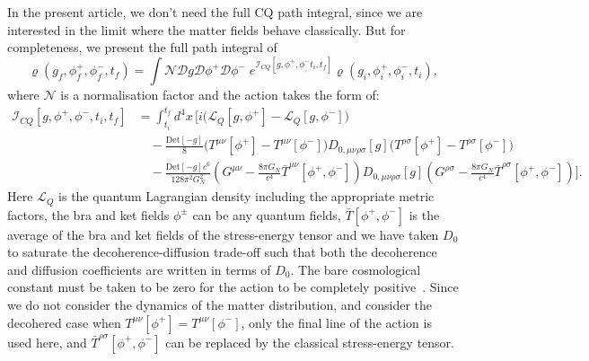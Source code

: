 \documentclass[aps,pra,amsmath,amssymb,amsthm,floatfix,nofootinbib,notitlepage,superscriptaddress,10pt]{revtex4-2}
\begin{document}
In the present article, we don't need the full CQ path integral, since we are interested in the limit where the matter fields behave classically. But for completeness, 
we present the full path integral of \cite{oppenheim2023covariant}
\begin{equation}
	\label{eq: GRPathMain}
	\varrho(g_f,\phi^+_f,\phi^-_f,t_f)= \int \mathcal{N} \mathcal{D} g\mathcal{D}\phi^+\mathcal{D}\phi^-  \; e^{\mathcal{I}_{CQ}[g,\phi^+,\phi^-_,t_i,t_f]}  \varrho(g_i,\phi^+_i,\phi^-_i,t_i) ,
\end{equation}
where $\mathcal{N}$ is a normalisation factor and the action takes the form of:
\begin{equation}
	\label{eq: CQaction}
	\begin{split}
		\mathcal{I}_{CQ}[g,\phi^+,\phi^-,t_i,t_f] &=\int_{t_i}^{t_f} d^4x\, \bigg[ i\big(\mathcal{L}_{Q}[g,\phi^+]-\mathcal{L}_{Q}[g,\phi^-]\big)\\&\quad -\frac{\text{Det}[-g]}{8}\big(T^{\mu\nu}[\phi^+] - T^{\mu \nu}[\phi^-]\big) D_{0,\mu \nu\rho \sigma}[g]\big(T^{\rho\sigma}[\phi^+] - T^{\rho \sigma}[\phi^-]\big) \\
		& \quad - \frac{\text{Det}[-g] c^6}{128\pi^2 G_N^2 } \left( G^{\mu \nu} - \frac{8 \pi G_N}{c^4}\bar{T}^{\mu\nu}[\phi^+,\phi^-]  \right) D_{0, \mu \nu \rho \sigma}[g] \left( G^{\rho \sigma} - \frac{8 \pi G_N}{c^4}\bar{T}^{\rho\sigma}[\phi^+,\phi^-]  \right)
		\bigg].
	\end{split}
\end{equation}
Here $\mathcal{L}_{Q}$ is the quantum Lagrangian density including the appropriate metric factors, the bra and ket fields $\phi^\pm$ can be any quantum fields, $\bar{T}[\phi^+,\phi^-]$ is the average of the bra and ket fields of the stress-energy tensor and we have taken $D_0$ to saturate the decoherence-diffusion trade-off \cite{oppenheim2023gravitationally} such that both the decoherence and diffusion coefficients are written in terms of $D_0$.  
The bare cosmological constant must be taken to be zero for the action to be completely positive~\cite{grudka2023renormalisable}.  Since we do not consider the dynamics of the matter distribution, and consider the decohered case when $T^{\mu\nu}[\phi^+]=T^{\mu\nu}[\phi^-]$, only the final line of the action is used here, and $\bar{T}^{\rho\sigma}[\phi^+,\phi^-]$ can be replaced by the classical stress-energy tensor.
\end{document}
